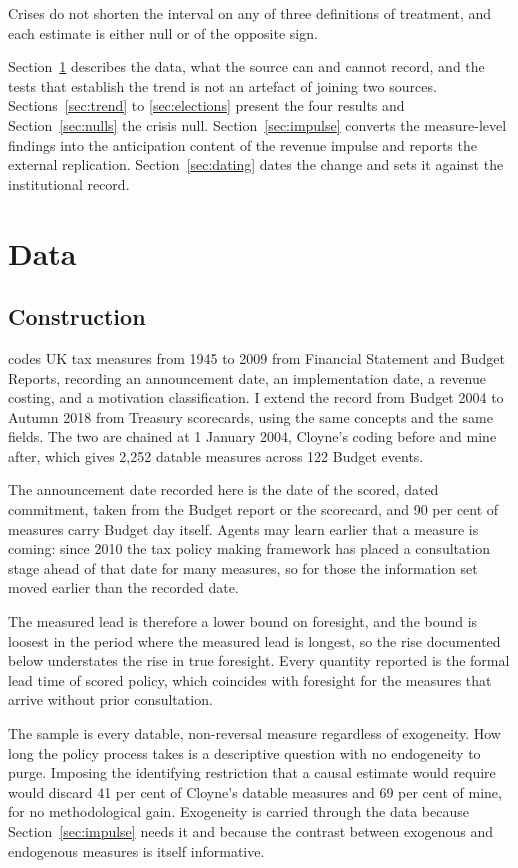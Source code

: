 \documentclass[11pt,a4paper]{article}
\begin{document}
Crises do not shorten the interval on any of three definitions of treatment, and each estimate is
either null or of the opposite sign.

Section~\ref{sec:data} describes the data, what the source can and cannot record, and the tests that
establish the trend is not an artefact of joining two sources. Sections~\ref{sec:trend} to
\ref{sec:elections} present the four results and Section~\ref{sec:nulls} the crisis null.
Section~\ref{sec:impulse} converts the measure-level findings into the anticipation content of the
revenue impulse and reports the external replication. Section~\ref{sec:dating} dates the change and
sets it against the institutional record.

\section{Data}\label{sec:data}

\subsection{Construction}

\citet{cloyne2013} codes UK tax measures from 1945 to 2009 from Financial Statement and Budget
Reports, recording an announcement date, an implementation date, a revenue costing, and a motivation classification. I extend the record from Budget 2004 to Autumn 2018 from Treasury scorecards, using
the same concepts and the same fields. The two are chained at 1 January 2004, Cloyne's coding before
and mine after, which gives 2,252 datable measures across 122 Budget events.

The announcement date recorded here is the date of the scored, dated commitment, taken from the
Budget report or the scorecard, and 90 per cent of measures carry Budget day itself. Agents may
learn earlier that a measure is coming: since 2010 the tax policy making framework has placed a
consultation stage ahead of that date for many measures, so for those the information set moved
earlier than the recorded date.

The measured lead is therefore a lower bound on foresight, and the bound is loosest in the period
where the measured lead is longest, so the rise documented below understates the rise in true
foresight. Every quantity reported is the formal lead time of scored policy, which coincides with
foresight for the measures that arrive without prior consultation.

The sample is every datable, non-reversal measure regardless of exogeneity. How long the policy process takes is a descriptive question with no endogeneity to purge. Imposing the identifying restriction that a causal estimate would require would discard 41 per cent of Cloyne's datable measures
and 69 per cent of mine, for no methodological gain. Exogeneity is carried through the data because
Section~\ref{sec:impulse} needs it and because the contrast between exogenous and endogenous measures
is itself informative.
\end{document}
